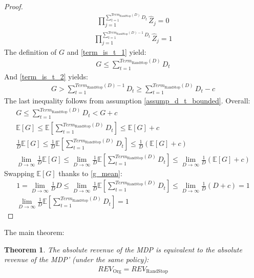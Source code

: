 \documentclass{article}
\newcommand{\E}[1]{\mathbb{E} \left[ #1 \right]}
\newcommand{\revorg}{\textit{REV}_\text{Org}}
\newcommand{\revaux}{\textit{REV}_\text{RandStop}}
\newcommand{\termaux}{\textit{Term}_\text{RandStop}}
\newtheorem{theorem}{Theorem}
\begin{document}
\begin{proof}
    \begin{gather}\label{term_is_t_1}
        \prod\limits_{j=1}^{\sum\limits_{t=1}^{\termaux(D)} D_t} \hat{Z}_j = 0
    \end{gather}
    \begin{gather}\label{term_is_t_2}
        \prod\limits_{j=1}^{\sum\limits_{t=1}^{\termaux(D)-1} D_t} \hat{Z}_j = 1
    \end{gather}
    The definition of $G$ and \eqref{term_is_t_1} yield:
    \begin{gather*}
        G \leq \sum\limits_{t=1}^{\termaux(D)} D_t
    \end{gather*}
    And \eqref{term_is_t_2} yields:
    \begin{gather*}
        G > \sum\limits_{t=1}^{\termaux(D)-1} D_t \geq \sum\limits_{t=1}^{\termaux(D)} D_t - c
    \end{gather*}
    The last inequality follows from assumption \ref{assump_d_t_bounded}.
    Overall:
    \begin{gather*}
        G \leq \sum\limits_{t=1}^{\termaux(D)} D_t < G + c \\
        \E{G} \leq \E{\sum\limits_{t=1}^{\termaux(D)} D_t} \leq \E{G} + c \\
        \frac{1}{D} \E{G} \leq \frac{1}{D} \E{\sum\limits_{t=1}^{\termaux(D)} D_t} \leq \frac{1}{D} (\E{G} + c) \\
        \lim\limits_{D \to \infty} \frac{1}{D} \E{G} \leq \lim\limits_{D \to \infty} \frac{1}{D} \E{\sum\limits_{t=1}^{\termaux(D)} D_t} \leq \lim\limits_{D \to \infty} \frac{1}{D} (\E{G} + c)
    \end{gather*}
    Swapping $\E{G}$ thanks to \eqref{g_mean}:
    \begin{gather*}
        1 = \lim\limits_{D \to \infty} \frac{1}{D} D \leq \lim\limits_{D \to \infty} \frac{1}{D} \E{\sum\limits_{t=1}^{\termaux(D)} D_t} \leq \lim\limits_{D \to \infty} \frac{1}{D} (D + c) = 1 \\
        \lim\limits_{D \to \infty} \frac{1}{D} \E{\sum\limits_{t=1}^{\termaux(D)} D_t} = 1
    \end{gather*}
\end{proof}

The main theorem:
\begin{theorem}\label{ar_ar_prime_eq}
    The absolute revenue of the MDP is equivalent to the absolute revenue of the MDP' (under the same policy):
    \begin{gather*}
        \revorg = \revaux
    \end{gather*}
\end{theorem}
\end{document}
